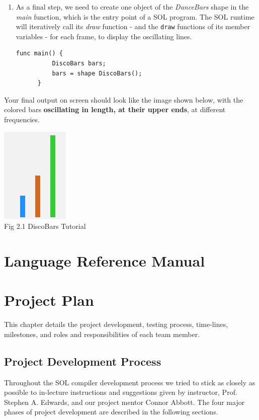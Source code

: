 \documentclass[letterpaper,12pt]{report}
\begin{document}
{\begin{enumerate}
    \item As a final step, we need to create one object of the \textit{DanceBars} shape in the \textit{main} function, which is the entry point of a SOL program. The SOL runtime will iteratively call its \textit{draw} function - and the \texttt{draw} functions of its member variables - for each frame, to display the oscillating lines.\\

    \begin{lstlisting}[style=sol, aboveskip=1pt]
      func main() {
          DiscoBars bars;
          bars = shape DiscoBars();
      }
    \end{lstlisting}
  \end{enumerate}

  Your final output on screen should look like the image shown below, with the colored bars \textbf{oscillating in length, at their upper ends}, at different frequencies.\\
  \begin{center}
      \includegraphics[scale=1]{dancing-bars.png}\\
      \caption{Fig 2.1 DiscoBars Tutorial}
  \end{center}


\chapter{Language Reference Manual} \label{lrm}

  

\chapter{Project Plan}

  This chapter details the project development, testing process, time-lines, milestones, and roles and responsibilities of each team member.

  \section{Project Development Process}
  Throughout the SOL compiler development process we tried to stick as closely as possible to in-lecture instructions and suggestions given by instructor, Prof. Stephen A. Edwards, and our project mentor Connor Abbott. The four major phases of project development are described in the following sections.

}
\end{document}
